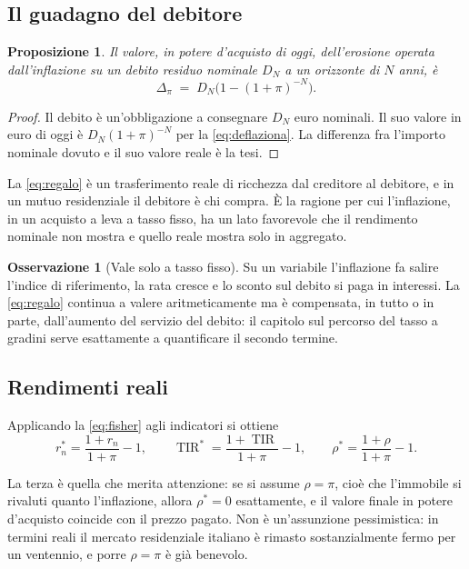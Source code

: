 \documentclass[11pt,a4paper]{article}
\theoremstyle{definition}
\newtheorem{osservazione}[definizione]{Osservazione}
\theoremstyle{plain}
\newtheorem{proposizione}[definizione]{Proposizione}
\DeclareMathOperator{\TIR}{TIR}
\begin{document}
\subsection{Il guadagno del debitore}

\begin{proposizione}
Il valore, in potere d'acquisto di oggi, dell'erosione operata dall'inflazione su un debito residuo nominale $D_N$ a un orizzonte di $N$ anni, è
\begin{equation}
\Delta_\pi \;=\; D_N\Big(1 - (1+\pi)^{-N}\Big).
\label{eq:regalo}
\end{equation}
\end{proposizione}

\begin{proof}
Il debito è un'obbligazione a consegnare $D_N$ euro nominali. Il suo valore in euro di oggi è $D_N(1+\pi)^{-N}$ per la \eqref{eq:deflaziona}. La differenza fra l'importo nominale dovuto e il suo valore reale è la tesi.
\end{proof}

La \eqref{eq:regalo} è un trasferimento reale di ricchezza dal creditore al debitore, e in un mutuo residenziale il debitore è chi compra. È la ragione per cui l'inflazione, in un acquisto a leva a tasso fisso, ha un lato favorevole che il rendimento nominale non mostra e quello reale mostra solo in aggregato.

\begin{osservazione}[Vale solo a tasso fisso]
Su un variabile l'inflazione fa salire l'indice di riferimento, la rata cresce e lo sconto sul debito si paga in interessi. La \eqref{eq:regalo} continua a valere aritmeticamente ma è compensata, in tutto o in parte, dall'aumento del servizio del debito: il capitolo sul percorso del tasso a gradini serve esattamente a quantificare il secondo termine.
\end{osservazione}

\subsection{Rendimenti reali}

Applicando la \eqref{eq:fisher} agli indicatori si ottiene
\begin{equation}
r_n^* = \frac{1+r_n}{1+\pi}-1,
\qquad
\TIR^* = \frac{1+\TIR}{1+\pi}-1,
\qquad
\rho^* = \frac{1+\rho}{1+\pi}-1 .
\label{eq:reali}
\end{equation}

La terza è quella che merita attenzione: se si assume $\rho = \pi$, cioè che l'immobile si rivaluti quanto l'inflazione, allora $\rho^*=0$ esattamente, e il valore finale in potere d'acquisto coincide con il prezzo pagato. Non è un'assunzione pessimistica: in termini reali il mercato residenziale italiano è rimasto sostanzialmente fermo per un ventennio, e porre $\rho=\pi$ è già benevolo.
\end{document}
